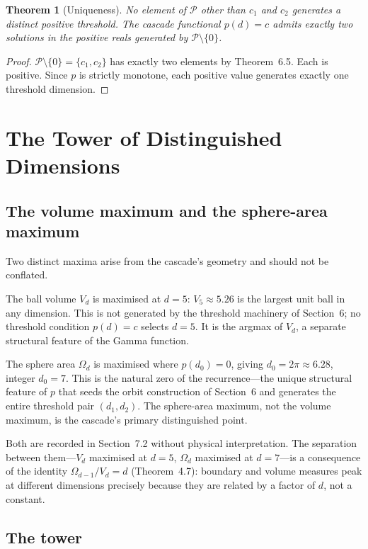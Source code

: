 \documentclass[11pt,a4paper]{article}
\newtheorem{theorem}{Theorem}[section]
\begin{document}
\begin{theorem}[Uniqueness]
No element of $\mathcal{P}$ other than $c_1$ and $c_2$ generates a distinct positive threshold. The cascade functional $p(d) = c$ admits exactly two solutions in the positive reals generated by $\mathcal{P}\setminus\{0\}$.
\end{theorem}

\begin{proof}
$\mathcal{P}\setminus\{0\} = \{c_1, c_2\}$ has exactly two elements by Theorem~6.5. Each is positive. Since $p$ is strictly monotone, each positive value generates exactly one threshold dimension.
\end{proof}

\section{The Tower of Distinguished Dimensions}

\subsection{The volume maximum and the sphere-area maximum}

Two distinct maxima arise from the cascade's geometry and should not be conflated.

The ball volume $V_d$ is maximised at $d=5$: $V_5\approx 5.26$ is the largest unit ball in any dimension. This is not generated by the threshold machinery of Section~6; no threshold condition $p(d) = c$ selects $d=5$. It is the argmax of $V_d$, a separate structural feature of the Gamma function.

The sphere area $\Omega_d$ is maximised where $p(d_0) = 0$, giving $d_0 = 2\pi\approx 6.28$, integer $d_0 = 7$. This is the natural zero of the recurrence---the unique structural feature of $p$ that seeds the orbit construction of Section~6 and generates the entire threshold pair $(d_1, d_2)$. The sphere-area maximum, not the volume maximum, is the cascade's primary distinguished point.

Both are recorded in Section~7.2 without physical interpretation. The separation between them---$V_d$ maximised at $d=5$, $\Omega_d$ maximised at $d=7$---is a consequence of the identity $\Omega_{d-1}/V_d = d$ (Theorem~4.7): boundary and volume measures peak at different dimensions precisely because they are related by a factor of $d$, not a constant.

\subsection{The tower}
\end{document}
